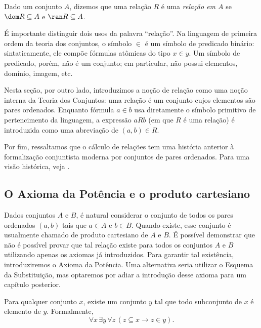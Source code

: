 \begin{definition}[$\BST$]\label{def:relacaoEmUmConjunto}
    Dado um conjunto $A$, dizemos que uma relação $R$ é uma \emph{relação em $A$} se $\dom R \subseteq A$ e $\ran R \subseteq A$.
\end{definition}

É importante distinguir dois usos da palavra ``relação''.
Na linguagem de primeira ordem da teoria dos conjuntos, o símbolo
$\in$ é um símbolo de predicado binário: sintaticamente, ele compõe fórmulas atômicas do tipo $x\in y$.
Um símbolo de
predicado, porém, não é um conjunto; em particular, não possui
elementos, domínio, imagem, etc.

Nesta seção, por outro lado, introduzimos a noção de relação como uma noção interna da Teoria dos Conjuntos: uma relação é um conjunto cujos elementos são pares ordenados.
Enquanto fórmula $a\in b$ usa diretamente o símbolo primitivo de
pertencimento da linguagem, a expressão $aRb$ (em que $R$ é uma relação) é introduzida como uma abreviação de $(a, b) \in R$.

Por fim, ressaltamos que o cálculo de relações tem uma história anterior à formalização conjuntista moderna por conjuntos de pares ordenados.
Para uma visão histórica, veja
\cite{maddux1991}.

\subsection{O Axioma da Potência e o produto cartesiano}\label{subsec:axiomaDaPotenciaEProdutoCartesiano}
Dados conjuntos $A$ e $B$, é natural considerar o conjunto de todos os pares ordenados $(a,b)$ tais que $a \in A$ e $b \in B$.
Quando existe, esse conjunto é usualmente chamado de produto cartesiano de $A$ e $B$.
É possível demonstrar que não é possível provar que tal relação existe para todos os conjuntos $A$ e $B$ utilizando apenas os axiomas já introduzidos.
Para garantir tal existência, introduziremos o Axioma da Potência.
Uma alternativa seria utilizar o Esquema da Substituição, mas optaremos por adiar a introdução desse axioma para um capítulo posterior.
\begin{axiom}\label{ax:potencia}
    Para qualquer conjunto $x$, existe um conjunto $y$ tal que todo subconjunto de $x$ é elemento de $y$.
    Formalmente,
    \[
        \forall x\, \exists y\, \forall z\,(z \subseteq x \rightarrow z \in y).
    \]
\end{axiom}

